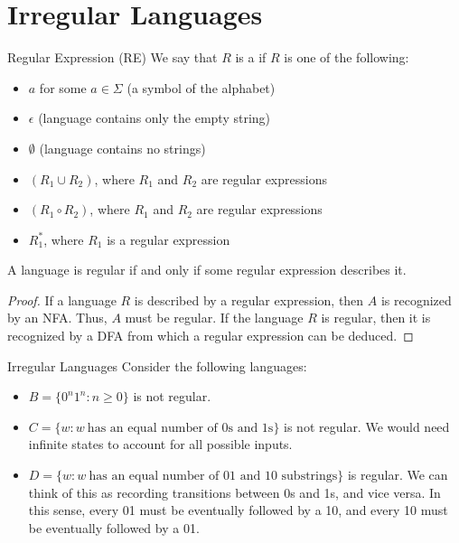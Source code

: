 \documentclass[12pt]{report}
\begin{document}
\chapter{Irregular Languages}
\begin{dfnbox}{Regular Expression (RE)}{}
    We say that $R$ is a  if $R$ is one of the following:
    \begin{itemize}[noitemsep]
        \item $a$ for some $a \in \Sigma$ (a symbol of the alphabet)
        \item $\epsilon$ (language contains only the empty string)
        \item $\emptyset$ (language contains no strings)
        \item $(R_1 \cup R_2)$, where $R_1$ and $R_2$ are regular expressions
        \item $(R_1 \circ R_2)$, where $R_1$ and $R_2$ are regular expressions
        \item $R_1^*$, where $R_1$ is a regular expression
    \end{itemize}
\end{dfnbox}

\begin{thmbox}{}{}
    A language is regular if and only if some regular expression describes it.
    \tcblower
    \begin{proof}
        If a language $R$ is described by a regular expression, then $A$ is recognized by an NFA. Thus, $A$ must be regular. If the language $R$ is regular, then it is recognized by a DFA from which a regular expression can be deduced.
    \end{proof}
\end{thmbox}

\begin{exbox}{Irregular Languages}{}
    Consider the following languages:
    \begin{itemize}[noitemsep]
        \item $B = \{ 0^n 1^n : n \geq 0\}$ is not regular.
        \item $C = \{ w : w\ \text{has an equal number of 0s and 1s} \}$ is not regular. We would need infinite states to account for all possible inputs.
        \item $D = \{ w : w\ \text{has an equal number of 01 and 10 substrings} \}$ is regular. We can think of this as recording transitions between 0s and 1s, and vice versa. In this sense, every 01 must be eventually followed by a 10, and every 10 must be eventually followed by a 01.
    \end{itemize}
\end{exbox}
\end{document}
